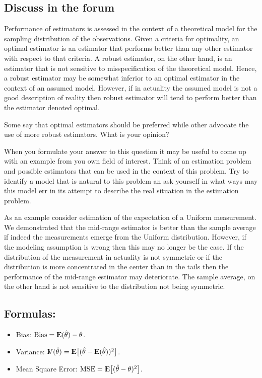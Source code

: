 \documentclass[]{krantz}
\newcommand{\Expec}{{\rm I\kern-.3em E}}
\newcommand{\Var}{{\rm I\kern-.3em V}}
\theoremstyle{definition}
\theoremstyle{definition}
\theoremstyle{definition}
\theoremstyle{remark}
\begin{document}
\subsection*{Discuss in the forum}\label{discuss-in-the-forum}


Performance of estimators is assessed in the context of a theoretical
model for the sampling distribution of the observations. Given a
criteria for optimality, an optimal estimator is an estimator that
performs better than any other estimator with respect to that criteria.
A robust estimator, on the other hand, is an estimator that is not
sensitive to misspecification of the theoretical model. Hence, a robust
estimator may be somewhat inferior to an optimal estimator in the
context of an assumed model. However, if in actuality the assumed model
is not a good description of reality then robust estimator will tend to
perform better than the estimator denoted optimal.

Some say that optimal estimators should be preferred while other
advocate the use of more robust estimators. What is your opinion?

When you formulate your answer to this question it may be useful to come
up with an example from you own field of interest. Think of an
estimation problem and possible estimators that can be used in the
context of this problem. Try to identify a model that is natural to this
problem an ask yourself in what ways may this model err in its attempt
to describe the real situation in the estimation problem.

As an example consider estimation of the expectation of a Uniform
measurement. We demonstrated that the mid-range estimator is better than
the sample average if indeed the measurements emerge from the Uniform
distribution. However, if the modeling assumption is wrong then this may
no longer be the case. If the distribution of the measurement in
actuality is not symmetric or if the distribution is more concentrated
in the center than in the tails then the performance of the mid-range
estimator may deteriorate. The sample average, on the other hand is not
sensitive to the distribution not being symmetric.

\subsection*{Formulas:}\label{formulas}


\begin{itemize}
\item
  Bias: \(\mathrm{Bias} = \Expec(\hat \theta) - \theta\).
\item
  Variance:
  \(\Var(\hat \theta) = \Expec\big[(\hat \theta - \Expec(\hat\theta))^2\big]\).
\item
  Mean Square Error:
  \(\mathrm{MSE} = \Expec\big[(\hat \theta - \theta)^2\big]\).
\end{itemize}
\end{document}
